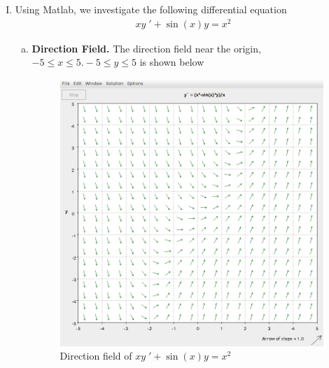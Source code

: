 \documentclass[a4paper,12pt]{article}
\begin{document}
\begin{enumerate}[I.]
  \item Using Matlab, we investigate the following differential equation
  \begin{align*}
    xy\;' + \sin(x)y = x^2
  \end{align*}
  \begin{enumerate}[a)]
    \item \textbf{Direction Field.} The direction field near the origin, $-5 \leq x \leq 5. -5 \leq y \leq 5$ is shown below
    \begin{figure}[H]
      \begin{center}
        \includegraphics[scale=.3]{31.png}
        \caption{Direction field of $xy\;' + \sin(x)y = x^2$}
        \label{fig:5}
      \end{center}
    \end{figure}
    

\end{enumerate}
\end{enumerate}
\end{document}
